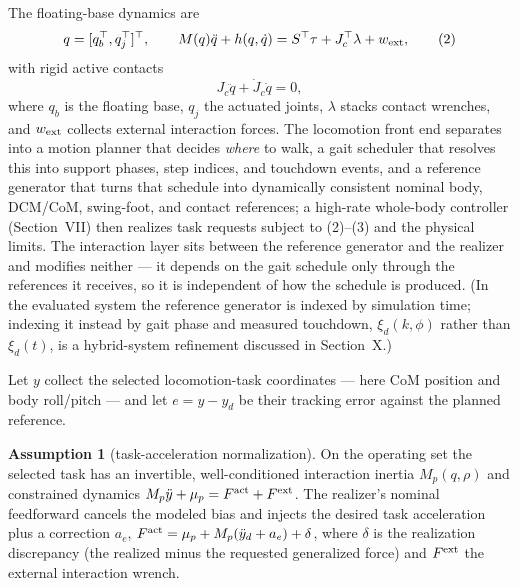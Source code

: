 \documentclass[journal]{IEEEtran}
\theoremstyle{plain}
\theoremstyle{definition}
\newtheorem{assumption}{Assumption}
\theoremstyle{remark}
\begin{document}
The floating-base dynamics are
\begin{equation}
q=[q_b^\top,q_j^\top]^\top,\qquad
M(q)\ddot q+h(q,\dot q)=S^\top\tau+J_c^\top\lambda+w_{\rm ext},
\tag{2}
\end{equation}
with rigid active contacts
\begin{equation}
J_c\ddot q+\dot J_c\dot q=0,
\tag{3}
\end{equation}
where $q_b$ is the floating base, $q_j$ the actuated joints, $\lambda$ stacks contact wrenches, and $w_{\rm ext}$ collects external interaction forces. The locomotion front end separates into a motion planner that decides \emph{where} to walk, a gait scheduler that resolves this into support phases, step indices, and touchdown events, and a reference generator that turns that schedule into dynamically consistent nominal body, DCM/CoM, swing-foot, and contact references; a high-rate whole-body controller (Section~VII) then realizes task requests subject to (2)--(3) and the physical limits. The interaction layer sits between the reference generator and the realizer and modifies neither --- it depends on the gait schedule only through the references it receives, so it is independent of how the schedule is produced. (In the evaluated system the reference generator is indexed by simulation time; indexing it instead by gait phase and measured touchdown, $\xi_d(k,\phi)$ rather than $\xi_d(t)$, is a hybrid-system refinement discussed in Section~X.)

Let $y$ collect the selected locomotion-task coordinates --- here CoM position and body roll/pitch --- and let $e=y-y_d$ be their tracking error against the planned reference.

\begin{assumption}[task-acceleration normalization]
On the operating set the selected task has an invertible, well-conditioned interaction inertia $M_p(q,\rho)$ and constrained dynamics $M_p\ddot y+\mu_p=F^{\rm act}+F^{\rm ext}$. The realizer's nominal feedforward cancels the modeled bias and injects the desired task acceleration plus a correction $a_e$, $F^{\rm act}=\mu_p+M_p(\ddot y_d+a_e)+\delta$, where $\delta$ is the realization discrepancy (the realized minus the requested generalized force) and $F^{\rm ext}$ the external interaction wrench.
\end{assumption}
\end{document}
